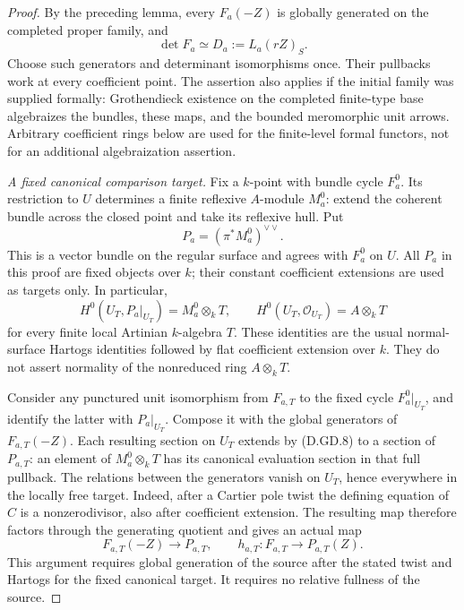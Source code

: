 \begin{proof}
By the preceding lemma, every $F_a(-Z)$ is globally generated
on the completed proper family, and
\[
             \det F_a\simeq D_a:=L_a(rZ)_S.              \tag{D.GD.6}
\]
Choose such generators and determinant isomorphisms once.
Their pullbacks work at every coefficient point. The
assertion also applies if the initial family was supplied
formally: Grothendieck existence on the completed finite-type
base algebraizes the bundles, these maps, and the bounded
meromorphic unit arrows. Arbitrary coefficient rings below
are used for the finite-level formal functors, not for an
additional algebraization assertion.

\emph{A fixed canonical comparison target.}
Fix a $k$-point with bundle cycle $F_a^0$. Its restriction
to $U$ determines a finite reflexive $A$-module $M_a^0$:
extend the coherent bundle across the closed point and take
its reflexive hull. Put
\[
                    P_a=(\pi^*M_a^0)^{\vee\vee}.
                                                        \tag{D.GD.7}
\]
This is a vector bundle on the regular surface and agrees
with $F_a^0$ on $U$. All $P_a$ in this proof are fixed
objects over $k$; their constant coefficient extensions
are used as targets only. In particular,
\[
 H^0(U_T,P_a|_{U_T})=M_a^0\otimes_kT,
 \qquad H^0(U_T,\mathcal O_{U_T})=A\otimes_kT           \tag{D.GD.8}
\]
for every finite local Artinian $k$-algebra $T$.
These identities are the usual normal-surface Hartogs
identities followed by flat coefficient extension over
$k$. They do not assert normality of the nonreduced ring
$A\otimes_kT$.

Consider any punctured unit isomorphism from $F_{a,T}$
to the fixed cycle $F_a^0|_{U_T}$, and identify the latter
with $P_a|_{U_T}$. Compose it with the global generators
of $F_{a,T}(-Z)$. Each resulting section on $U_T$ extends
by (D.GD.8) to a section of $P_{a,T}$: an element of
$M_a^0\otimes_kT$ has its canonical evaluation section in
that full pullback. The relations between the generators
vanish on $U_T$, hence everywhere in the locally free
target. Indeed, after a Cartier pole twist the defining
equation of $C$ is a nonzerodivisor, also after coefficient
extension. The resulting map therefore factors through
the generating quotient and gives an actual map
\[
        F_{a,T}(-Z)\longrightarrow P_{a,T},\qquad
        h_{a,T}:F_{a,T}\longrightarrow P_{a,T}(Z).
                                                        \tag{D.GD.9}
\]
This argument requires global generation of the source
after the stated twist and Hartogs for the fixed canonical
target. It requires no relative fullness of the source.


\end{proof}
